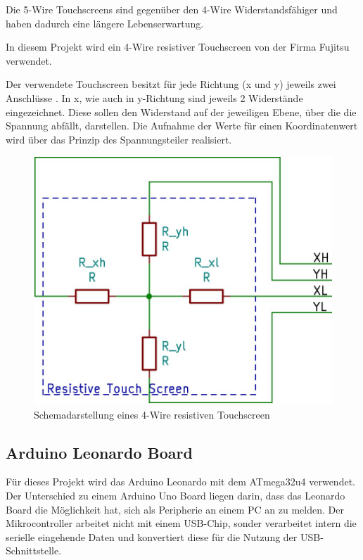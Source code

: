 Die 5-Wire Touchscreens sind gegenüber den 4-Wire Widerstandsfähiger und haben dadurch eine längere Lebenserwartung.\cite{5w4w}

In diesem Projekt wird ein 4-Wire resistiver Touchscreen von der Firma Fujitsu verwendet.

Der verwendete Touchscreen besitzt für jede Richtung (x und y) jeweils zwei Anschlüsse . In x, wie auch in y-Richtung sind jeweils 2 Widerstände eingezeichnet. 
Diese sollen den Widerstand auf der jeweiligen Ebene, über die die Spannung abfällt, darstellen.
Die Aufnahme der Werte für einen Koordinatenwert wird über das Prinzip des Spannungsteiler realisiert.
\begin{figure}
    \centering
    \includegraphics[width=0.6\linewidth]{fig/4-wire.jpg}
    \caption{Schemadarstellung eines 4-Wire resistiven Touchscreen}
    \label{fig:4w}
\end{figure}
\subsection{Arduino Leonardo Board}
Für dieses Projekt wird das Arduino Leonardo mit dem ATmega32u4 verwendet. 
Der Unterschied zu einem Arduino Uno Board liegen darin, dass das Leonardo Board die Möglichkeit hat, sich als Peripherie an einem PC an zu melden. 
Der Mikrocontroller arbeitet nicht mit einem USB-Chip, sonder verarbeitet intern die serielle eingehende Daten und konvertiert diese für die Nutzung der USB-Schnittstelle.

